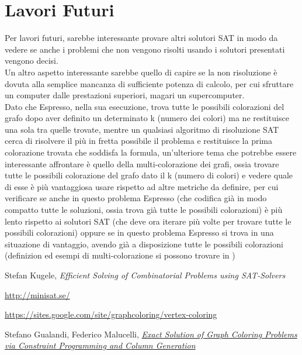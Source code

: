 \documentclass[a4paper,11pt]{article} %
\begin{document}
\section{Lavori Futuri}
Per lavori futuri, sarebbe interessante provare altri solutori SAT in modo da vedere se anche i problemi che non vengono risolti usando i solutori presentati vengono decisi.\\
Un altro aspetto interessante sarebbe quello di capire se la non risoluzione è dovuta alla semplice mancanza di sufficiente potenza di calcolo, per cui sfruttare un computer dalle prestazioni superiori, magari un supercomputer.\\
Dato che Espresso, nella sua esecuzione, trova tutte le possibili colorazioni del grafo dopo aver definito un determinato k (numero dei colori) ma ne restituisce una sola tra quelle trovate, mentre un qualsiasi algoritmo di risoluzione SAT cerca di risolvere il più in fretta possibile il problema e restituisce la prima colorazione trovata che soddisfa la formula, un'ulteriore tema che potrebbe essere interessante affrontare è quello della multi-colorazione dei grafi, ossia trovare tutte le possibili colorazione del grafo dato il k (numero di colori) e vedere quale di esse è più vantaggiosa usare rispetto ad altre metriche da definire, per cui verificare se anche in questo problema Espresso (che codifica già in modo compatto tutte le soluzioni, ossia trova già tutte le possibili colorazioni) è più lento rispetto ai solutori SAT (che deve ora iterare più volte per trovare tutte le possibili colorazioni) oppure se in questo problema Espresso si trova in una situazione di vantaggio, avendo già a disposizione tutte le possibili colorazioni (definizion ed esempi di multi-colorazione si possono trovare in \cite{tesi2})


\pagebreak

\begin{thebibliography}{9}
	 Stefan Kugele,  
	\emph{Efficient Solving of Combinatorial Problems using SAT-Solvers}
	
	 \href{http://minisat.se/}{http://minisat.se/}
	
	 \href{https://sites.google.com/site/graphcoloring/vertex-coloring}{https://sites.google.com/site/graphcoloring/vertex-coloring}
	
	 Stefano Gualandi, Federico Malucelli,  \href{http://www.optimization-online.org/DB_FILE/2010/03/2568.pdf}{\emph{Exact Solution of Graph Coloring Problems via Constraint Programming and Column Generation}}
\end{thebibliography}
\end{document}
